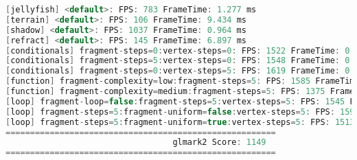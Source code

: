 \documentclass[onecolumn]{preport}
\begin{document}
\begin{lstlisting}[language=c]
[jellyfish] <default>: FPS: 783 FrameTime: 1.277 ms
[terrain] <default>: FPS: 106 FrameTime: 9.434 ms
[shadow] <default>: FPS: 1037 FrameTime: 0.964 ms
[refract] <default>: FPS: 145 FrameTime: 6.897 ms
[conditionals] fragment-steps=0:vertex-steps=0: FPS: 1522 FrameTime: 0.657 ms
[conditionals] fragment-steps=5:vertex-steps=0: FPS: 1548 FrameTime: 0.646 ms
[conditionals] fragment-steps=0:vertex-steps=5: FPS: 1619 FrameTime: 0.618 ms
[function] fragment-complexity=low:fragment-steps=5: FPS: 1585 FrameTime: 0.631 ms
[function] fragment-complexity=medium:fragment-steps=5: FPS: 1375 FrameTime: 0.727 ms
[loop] fragment-loop=false:fragment-steps=5:vertex-steps=5: FPS: 1545 FrameTime: 0.647 ms
[loop] fragment-steps=5:fragment-uniform=false:vertex-steps=5: FPS: 1595 FrameTime: 0.627 ms
[loop] fragment-steps=5:fragment-uniform=true:vertex-steps=5: FPS: 1513 FrameTime: 0.661 ms
=======================================================
                                  glmark2 Score: 1149
=======================================================
\end{lstlisting}




\end{document}
